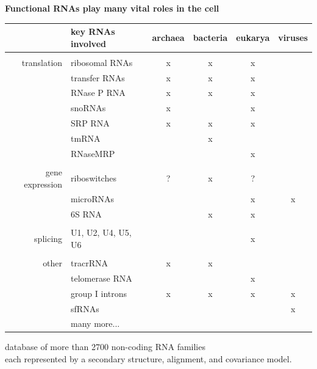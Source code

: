 \documentclass[landscape]{slides}
\begin{document}
\begin{slide}
\begin{center}
\textbf{Functional RNAs play many vital roles in the cell}
\end{center}
\medskip

\small
\begin{center}
\begin{tabular}{r|l|cccc}
 & key RNAs involved & archaea & bacteria & eukarya & viruses \\ \hline
 & \\ 
translation & ribosomal RNAs & x & x & x & \\
            & transfer RNAs  & x & x & x & \\
            & RNase P RNA    & x & x & x & \\
            & snoRNAs        & x &   & x & \\ 
            & SRP RNA        & x & x & x & \\ 
            & tmRNA          &   & x &   & \\ 
            & RNaseMRP       &   &   & x & \\ 
            &  \\ 
gene expression & riboswitches & ? & x & ? & \\
                & microRNAs &  & & x & x \\
                & 6S RNA & & x & x & \\ 
                & \\ 
splicing        & U1, U2, U4, U5, U6 & & & x & \\ 
                & \\
other           & tracrRNA       & x & x & \\
                & telomerase RNA & & & x & \\ 
                & group I introns& x & x & x & x \\
                & sfRNAs       & & & & x \\
                & many more... & & & & \\ 
\end{tabular}



database of more than 2700 non-coding RNA families \\ each represented by a
secondary structure, alignment, and covariance model.
\end{center}

\vfill
\end{slide}
\end{document}

